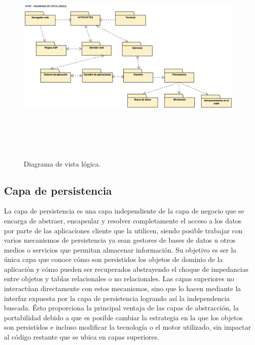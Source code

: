 \documentclass[12pt,a4paper, twoside]{report}
\begin{document}
	\begin{figure}[!ht]   
		\caption{Diagrama de vista lógica.} 
		\begin{center} 
			\includegraphics[width=18cm,height=10cm]{Images/design/d_logicview} \\
			\label{fig:design_logicview} 
		\end{center}  
	\end{figure}	
	
	\subsection{Capa de persistencia} \label{persistencia}
	
	La capa de persistencia es una capa independiente de la capa de negocio que se encarga de abstraer, encapsular y resolver completamente el acceso a los datos por parte de las aplicaciones cliente que la utilicen, siendo posible trabajar con varios mecanismos de persistencia ya sean gestores de bases de datos u otros medios o servicios que permitan almacenar información. Su objetivo es ser la única capa que conoce cómo son persistidos los objetos de dominio de la aplicación y cómo pueden ser recuperados abstrayendo el choque de impedancias entre objetos y tablas relacionales o no relacionales. Las capas superiores no interactúan directamente con estos mecanismos, sino que lo hacen mediante la interfaz expuesta por la capa de persistencia logrando así la independencia buscada. Ésto proporciona la principal ventaja de las capas de abstracción, la portabilidad debido a que es posible cambiar la estrategia en la que los objetos son persistidos e incluso modificar la tecnología o el motor utilizado, sin impactar al código restante que se ubica en capas superiores. \\
	
\end{document}

